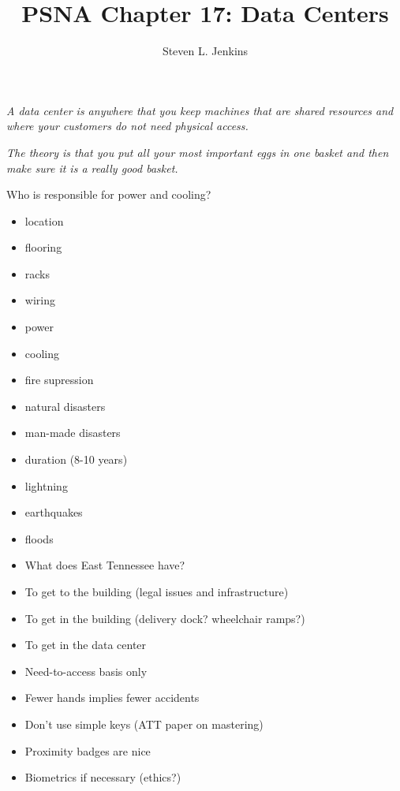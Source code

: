 \documentclass{slides}
\title{PSNA Chapter 17: Data Centers}
\author{Steven L. Jenkins}
\newcommand{\bi}{\begin{itemize}}
\newcommand{\ei}{\end{itemize}}
\begin{document}

\emph{A data center is anywhere that you keep machines that are
shared resources and where your customers do not need physical access.}

\emph{The theory is that you put all your most important eggs in one basket
and then make sure it is a really good basket.}

Who is responsible for power and cooling?


\bi
\item location
\item flooring
\item racks
\item wiring
\item power
\item cooling
\ei


\bi
\item fire supression
\item natural disasters
\item man-made disasters
\item duration (8-10 years)
\ei


\bi
\item lightning
\item earthquakes
\item floods
\item What does East Tennessee have?
\ei


\bi
\item To get to the building (legal issues and infrastructure)
\item To get in the building (delivery dock? wheelchair ramps?)
\item To get in the data center
\ei


\bi
\item Need-to-access basis only
\item Fewer hands implies fewer accidents
\item Don't use simple keys (ATT paper on mastering)
\item Proximity badges are nice
\item Biometrics if necessary (ethics?)
\ei

\end{document}
